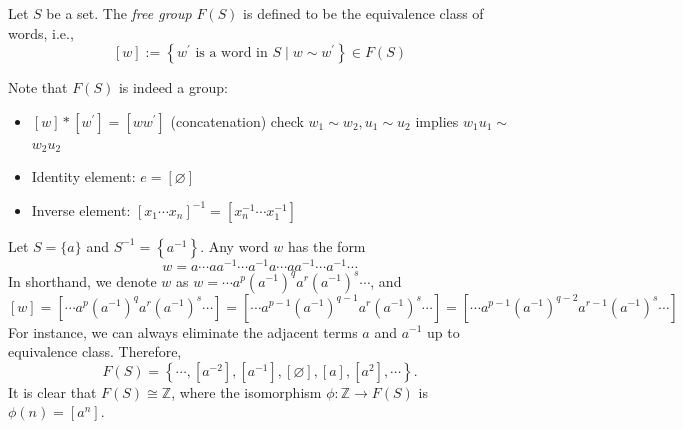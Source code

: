 \begin{definition}  Let $S$ be a set. The \emph{free group} \(F\left( S\right)\) is defined to be the equivalence class of words, i.e.,
\[
\left\lbrack  w\right\rbrack   \mathrel{\text{ := }} \left\{  {{w}^{\prime }\text{ is a word in }S \mid  w \sim  {w}^{\prime }}\right\}   \in  F\left( S\right)
\]
\end{definition}

Note that \(F\left( S\right)\) is indeed a group:
\begin{itemize}
\item \(\left\lbrack  w\right\rbrack   * \left\lbrack  {w}^{\prime }\right\rbrack   = \left\lbrack  {w{w}^{\prime }}\right\rbrack\) (concatenation) check \({w}_{1} \sim  {w}_{2},{u}_{1} \sim  {u}_{2}\) implies \({w}_{1}{u}_{1} \sim\)  \({w}_{2}{u}_{2}\)

\item Identity element: \(e = \left\lbrack  \varnothing \right\rbrack\)

\item Inverse element: \({\left\lbrack  {x}_{1}\cdots {x}_{n}\right\rbrack  }^{-1} = \left\lbrack  {{x}_{n}^{-1}\cdots {x}_{1}^{-1}}\right\rbrack\)
\end{itemize}

\begin{example} Let \(S = \{ a\}\) and \({S}^{-1} = \left\{  {a}^{-1}\right\}\). Any word \(w\) has the form
\[
w = a\cdots a{a}^{-1}\cdots {a}^{-1}a\cdots a{a}^{-1}\cdots {a}^{-1}\cdots
\]
In shorthand, we denote \(w\) as \(w = \cdots {a}^{p}{\left( {a}^{-1}\right) }^{q}{a}^{r}{\left( {a}^{-1}\right) }^{s}\cdots\), and
\[
\left\lbrack  w\right\rbrack   = \left\lbrack  {\cdots {a}^{p}{\left( {a}^{-1}\right) }^{q}{a}^{r}{\left( {a}^{-1}\right) }^{s}\cdots }\right\rbrack   = \left\lbrack  {\cdots {a}^{p - 1}{\left( {a}^{-1}\right) }^{q - 1}{a}^{r}{\left( {a}^{-1}\right) }^{s}\cdots }\right\rbrack
= \left\lbrack  {\cdots {a}^{p - 1}{\left( {a}^{-1}\right) }^{q - 2}{a}^{r - 1}{\left( {a}^{-1}\right) }^{s}\cdots }\right\rbrack
\]
For instance, we can always eliminate the adjacent terms \(a\) and \({a}^{-1}\) up to equivalence class. Therefore, 
\[F\left( S\right)  = \left\{  {\cdots,\left\lbrack  {a}^{-2}\right\rbrack ,\left\lbrack  {a}^{-1}\right\rbrack ,\left\lbrack  \varnothing \right\rbrack ,\left\lbrack  a\right\rbrack ,\left\lbrack  {a}^{2}\right\rbrack ,\cdots }\right\}.\]
It is clear that \(F\left( S\right)  \cong  \mathbb{Z}\), where the isomorphism \(\phi  : \mathbb{Z} \rightarrow  F\left( S\right)\) is \(\phi \left( n\right)  = \left\lbrack  {a}^{n}\right\rbrack\).
\end{example}

